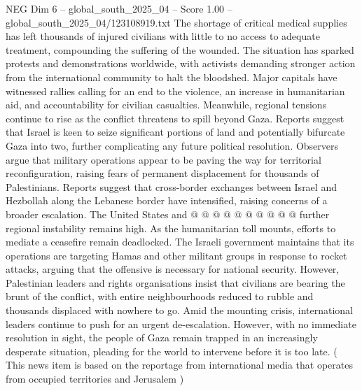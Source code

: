 \begin{textsample}{NEG Dim 6 – global\_south\_2025\_04 – Score 1.00 – global\_south\_2025\_04/123108919.txt}
The shortage of critical medical supplies has left thousands of injured civilians with little to no access to adequate treatment, compounding the suffering of the wounded.
The situation has sparked protests and demonstrations worldwide, with activists demanding stronger action from the international community to halt the bloodshed.
Major capitals have witnessed rallies calling for an end to the violence, an increase in humanitarian aid, and accountability for civilian casualties.
Meanwhile, regional tensions continue to rise as the conflict threatens to spill beyond Gaza.
Reports suggest that Israel is keen to seize significant portions of land and potentially bifurcate Gaza into two, further complicating any future political resolution.
Observers argue that military operations appear to be paving the way for territorial reconfiguration, raising fears of permanent displacement for thousands of Palestinians.
Reports suggest that cross-border exchanges between Israel and Hezbollah along the Lebanese border have intensified, raising concerns of a broader escalation.
The United States and @ @ @ @ @ @ @ @ @ @ further regional instability remains high.
As the humanitarian toll mounts, efforts to mediate a ceasefire remain deadlocked.
The Israeli government maintains that its operations are targeting Hamas and other militant groups in response to rocket attacks, arguing that the offensive is necessary for national security.
However, Palestinian leaders and rights organisations insist that civilians are bearing the brunt of the conflict, with entire neighbourhoods reduced to rubble and thousands displaced with nowhere to go.
Amid the mounting crisis, international leaders continue to push for an urgent de-escalation.
However, with no immediate resolution in sight, the people of Gaza remain trapped in an increasingly desperate situation, pleading for the world to intervene before it is too late. ( This news item is based on the reportage from international media that operates from occupied territories and Jerusalem )

\end{textsample}
